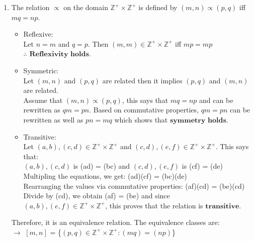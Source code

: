 \documentclass{article}
\newcommand{\Z}{\mathbb{Z}}
\begin{document}
\begin{enumerate}
\begin{enumerate}
    \item The relation $\varpropto$ on the domain $\Z^+\times\Z^+$ is defined by $(m,n) \varpropto (p,q)$ iff $mq = np$.
    \begin{itemize}
        \item Reflexive:\\Let $n = m$ and $q = p$. Then $(m,m) \in \Z^+\times\Z^+$ iff $mp = mp$\\$\therefore$ $\textbf{Reflexivity holds.}$\\
        \item Symmetric:\\Let $(m,n)$ and $(p,q)$ are related then it implies $(p,q)$ and $(m,n)$ are related.\\Assume that $(m,n) \varpropto (p,q)$,
        this says that $mq = np$ and can be rewritten as $qm = pn$. Based on commutative properties, $qm = pn$ can be rewritten as well as $pn = mq$ 
        which shows that $\textbf{symmetry holds}$.\\
        \item Transitive:\\ Let $(a,b), (c,d) \in \Z^+\times\Z^+$ and $(c,d), (e,f) \in \Z^+\times\Z^+$. This says that:\\ $(a,b), (c,d)$ is (ad) = (bc) and $(c,d), (e,f)$ is (cf) = (de)\\
        Multipling the equations, we get: (ad)(cf) = (bc)(de)\\
        Rearranging the values via commutative properties: (af)(cd) = (be)(cd)\\
        Divide by (cd), we obtain (af) = (be) and since $(a,b), (e,f) \in \Z^+\times\Z^+$, this proves 
        that the relation is $\textbf{transitive}$.
    \end{itemize}
Therefore, it is an equivalence relation. The equivalence classes are:\\
$\rightarrow$ $[m,n]$ = \{$(p,q) \in \Z^+\times\Z^+:(mq)=(np)$\}\\

\end{enumerate}

\end{enumerate}
\end{document}
